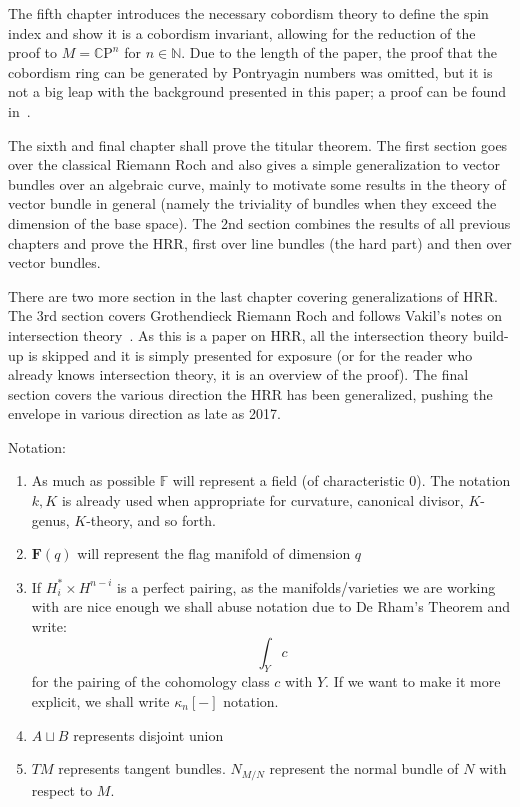 \documentclass{ut-thesis}
\newcommand{\F}{{\mathbb{F}}}
\newcommand{\N}{{\mathbb{N}}}
\newcommand{\CP}{{\mathbb{C}\mathrm{P}}}
\newcommand{\dcup}{\sqcup}
\begin{document}
The fifth chapter introduces the necessary cobordism theory to define the spin index and show it is a cobordism
invariant, allowing for the reduction of the proof to $M = \CP^n$ for $n \in\N$. Due to the length of the
paper, the proof that the cobordism ring can be generated by Pontryagin numbers was omitted, but it is not
a big leap with the background presented in this paper; a proof can be found
in~\cite{hirzebruchTopologicalMethodsAlgebraic1995}.

The sixth and final chapter shall prove the titular theorem. The first section goes over the classical Riemann
Roch and also gives a simple generalization to vector bundles over an algebraic curve, mainly to motivate some
results in the theory of vector bundle in general (namely the triviality of bundles when they exceed the
dimension of the base space). The 2nd section combines the results of all previous chapters and prove the HRR,
first over line bundles (the hard part) and then over vector bundles.

There are two more section in the last chapter covering generalizations of HRR. The 3rd section covers
Grothendieck Riemann Roch and follows Vakil's notes on intersection theory~\cite{vakilIntersectionTheory}. As
this is a paper on HRR, all the intersection theory build-up is skipped and it is simply presented for exposure
(or for the reader who already knows intersection theory, it is an overview of the proof). The final section
covers the various direction the HRR has been generalized, pushing the envelope in various direction as late
as 2017.


Notation:
\begin{enumerate}
  \item As much as possible $\F$ will represent a field (of characteristic $0$). The notation $k, K$ is
    already used when appropriate for curvature, canonical divisor, $K$-genus, $K$-theory, and so forth.
  \item $\mathbf{F}(q)$ will represent the flag manifold of dimension $q$
  \item If $H_i^* \times H^{n-i}$ is a perfect pairing, as the manifolds/varieties we are working with are
    nice enough we shall abuse notation due to De Rham's Theorem and write:
    \[
      \int_Y c
    \]
    for the pairing of the cohomology class $c$ with $Y$. If we want to make it more explicit, we shall write
    $\kappa_n[-]$ notation.
   \item $A\dcup B$ represents disjoint union
   \item $TM$ represents tangent bundles. $N_{M/N}$ represent the normal bundle of $N$ with respect
     to $M$.
\end{enumerate}
\end{document}
